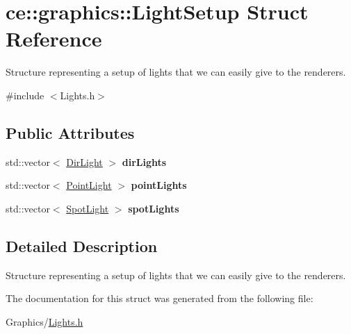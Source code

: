 \hypertarget{structce_1_1graphics_1_1_light_setup}{}\section{ce\+:\+:graphics\+:\+:Light\+Setup Struct Reference}
\label{structce_1_1graphics_1_1_light_setup}


Structure representing a setup of lights that we can easily give to the renderers.  




{\ttfamily \#include $<$Lights.\+h$>$}

\subsection*{Public Attributes}
\begin{DoxyCompactItemize}
\item 
\mbox{\label{structce_1_1graphics_1_1_light_setup_a244f07e42597b634054c7c1b7733054d}} 
std\+::vector$<$ \hyperlink{classce_1_1graphics_1_1_dir_light}{Dir\+Light} $>$ {\bfseries dir\+Lights}
\item 
\mbox{\label{structce_1_1graphics_1_1_light_setup_aed06cdb1ef61afd4705c26ef1781637e}} 
std\+::vector$<$ \hyperlink{classce_1_1graphics_1_1_point_light}{Point\+Light} $>$ {\bfseries point\+Lights}
\item 
\mbox{\label{structce_1_1graphics_1_1_light_setup_a68944c5cb6b197a32fe5bfdd89e3ed4a}} 
std\+::vector$<$ \hyperlink{classce_1_1graphics_1_1_spot_light}{Spot\+Light} $>$ {\bfseries spot\+Lights}
\end{DoxyCompactItemize}


\subsection{Detailed Description}
Structure representing a setup of lights that we can easily give to the renderers. 

The documentation for this struct was generated from the following file\+:\begin{DoxyCompactItemize}
\item 
Graphics/\hyperlink{_lights_8h}{Lights.\+h}\end{DoxyCompactItemize}
